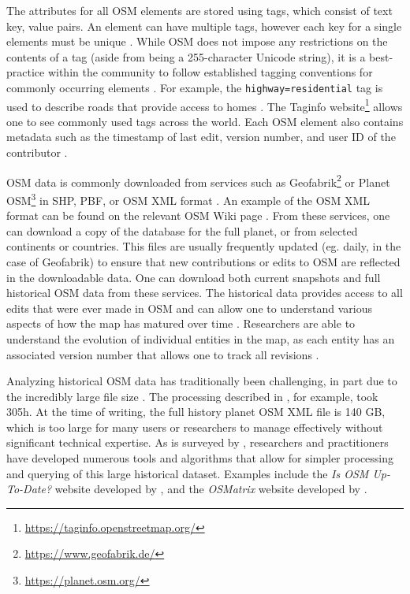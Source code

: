 The attributes for all OSM elements are stored using tags, which consist of text key, value pairs. An element can have multiple tags, however each key for a single elements must be unique \parencite{noauthor_tags_2020}. While OSM does not impose any restrictions on the contents of a tag (aside from being a 255-character Unicode string), it is a best-practice within the community to follow established tagging conventions for commonly occurring elements \parencite{noauthor_tags_2020}. For example, the \texttt{highway=residential} tag is used to describe roads that provide access to homes \parencite{noauthor_elements_2020}. The Taginfo website\footnote{\url{https://taginfo.openstreetmap.org/}} allows one to see commonly used tags across the world. Each OSM element also contains metadata such as the timestamp of last edit, version number, and user ID of the contributor \parencite{noauthor_elements_2020}. 

OSM data is commonly downloaded from services such as Geofabrik\footnote{\url{https://www.geofabrik.de/}} or Planet OSM\footnote{\url{https://planet.osm.org/}} in SHP, PBF, or OSM XML format \parencite{mooney_accessing_2011}. An example of the OSM XML format can be found on the relevant OSM Wiki page \parencite{noauthor_osm_2017}. From these services, one can download a copy of the database for the full planet, or from selected continents or countries. This files are usually frequently updated (eg. daily, in the case of Geofabrik) to ensure that new contributions or edits to OSM are reflected in the downloadable data. One can download both current snapshots and full historical OSM data from these services. The historical data provides access to all edits that were ever made in OSM and can allow one to understand various aspects of how the map has matured over time \parencite{corcoran_analysing_2013, mooney_characteristics_2012}. Researchers are able to understand the evolution of individual entities in the map, as each entity has an associated version number that allows one to track all revisions \parencite{noauthor_elements_2020}. 

Analyzing historical OSM data has traditionally been challenging, in part due to the incredibly large file size \parencite{raifer_oshdb_2019, mooney_accessing_2011}. The processing described in \textcite{mooney_characteristics_2012}, for example, took 305h. At the time of writing, the full history planet OSM XML file is 140 GB, which is too large for many users or researchers to manage effectively without significant technical expertise. As is surveyed by \textcite{raifer_oshdb_2019}, researchers and practitioners have developed numerous tools and algorithms that allow for simpler processing and querying of this large historical dataset. Examples include the \textit{Is OSM Up-To-Date?} website developed by \textcite{minghini_open_2018}, and the \textit{OSMatrix} website developed by \textcite{roick_technical_2012}. 

